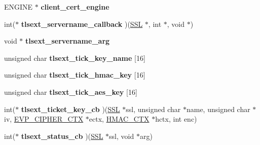 \begin{DoxyCompactItemize}
\item 
\hypertarget{structssl__ctx__st_ae6bb617a63017d5c8e7eccc6f8030185}{}E\+N\+G\+I\+N\+E $\ast$ {\bfseries client\+\_\+cert\+\_\+engine}\label{structssl__ctx__st_ae6bb617a63017d5c8e7eccc6f8030185}

\item 
\hypertarget{structssl__ctx__st_aa6c57ade4e374ba2092309192e700b45}{}int($\ast$ {\bfseries tlsext\+\_\+servername\+\_\+callback} )(\hyperlink{structssl__st}{S\+S\+L} $\ast$, int $\ast$, void $\ast$)\label{structssl__ctx__st_aa6c57ade4e374ba2092309192e700b45}

\item 
\hypertarget{structssl__ctx__st_a2ab57baeccaab0b8d7ecc9c478f3ee14}{}void $\ast$ {\bfseries tlsext\+\_\+servername\+\_\+arg}\label{structssl__ctx__st_a2ab57baeccaab0b8d7ecc9c478f3ee14}

\item 
\hypertarget{structssl__ctx__st_a7f5cf468448dbbe1ae706c152d4abee5}{}unsigned char {\bfseries tlsext\+\_\+tick\+\_\+key\+\_\+name} \mbox{[}16\mbox{]}\label{structssl__ctx__st_a7f5cf468448dbbe1ae706c152d4abee5}

\item 
\hypertarget{structssl__ctx__st_a3bbed4399466da935affa8b11dc37967}{}unsigned char {\bfseries tlsext\+\_\+tick\+\_\+hmac\+\_\+key} \mbox{[}16\mbox{]}\label{structssl__ctx__st_a3bbed4399466da935affa8b11dc37967}

\item 
\hypertarget{structssl__ctx__st_ad6776ce4d46e74ca3580f34365c53b41}{}unsigned char {\bfseries tlsext\+\_\+tick\+\_\+aes\+\_\+key} \mbox{[}16\mbox{]}\label{structssl__ctx__st_ad6776ce4d46e74ca3580f34365c53b41}

\item 
\hypertarget{structssl__ctx__st_a87b05e20d2f45baa5f9a6ea0cd2d08c5}{}int($\ast$ {\bfseries tlsext\+\_\+ticket\+\_\+key\+\_\+cb} )(\hyperlink{structssl__st}{S\+S\+L} $\ast$ssl, unsigned char $\ast$name, unsigned char $\ast$iv, \hyperlink{structevp__cipher__ctx__st}{E\+V\+P\+\_\+\+C\+I\+P\+H\+E\+R\+\_\+\+C\+T\+X} $\ast$ectx, \hyperlink{structhmac__ctx__st}{H\+M\+A\+C\+\_\+\+C\+T\+X} $\ast$hctx, int enc)\label{structssl__ctx__st_a87b05e20d2f45baa5f9a6ea0cd2d08c5}

\item 
\hypertarget{structssl__ctx__st_a950b7e9a873dcdd4af6363290e35d484}{}int($\ast$ {\bfseries tlsext\+\_\+status\+\_\+cb} )(\hyperlink{structssl__st}{S\+S\+L} $\ast$ssl, void $\ast$arg)\label{structssl__ctx__st_a950b7e9a873dcdd4af6363290e35d484}


\end{DoxyCompactItemize}

